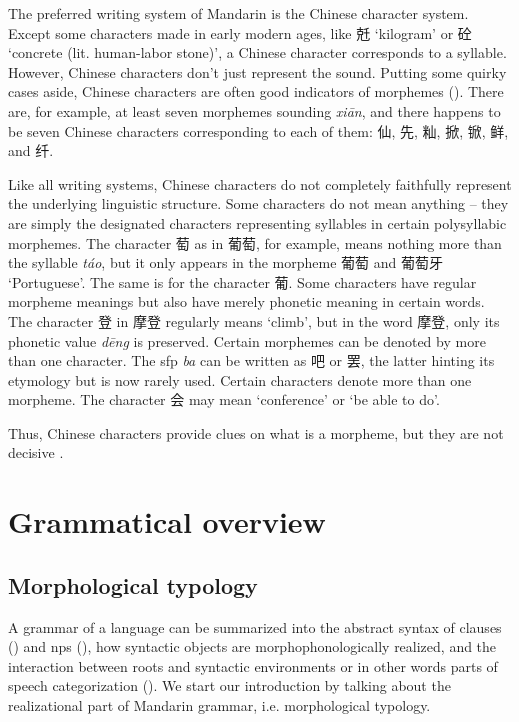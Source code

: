 \documentclass[UTF8, a4paper, oneside, scheme=plain, 12pt]{ctexrep}
\newcommand{\form}[1]{\emph{#1}}
\newcommand{\translate}[1]{`#1'}
\begin{document}
The preferred writing system of Mandarin is the Chinese character system.
Except some characters made in early modern ages,
like 兛 \translate{kilogram} or 砼 \translate{concrete (lit. human-labor stone)},
a Chinese character corresponds to a syllable.
However, Chinese characters don't just represent the sound.
Putting some quirky cases aside,
Chinese characters are often good indicators of morphemes
().
There are, for example, at least seven morphemes sounding \form{xi\={a}n},
and there happens to be seven Chinese characters corresponding to each of them:
仙, 先, 籼, 掀, 锨, 鲜, and 纤.

Like all writing systems, 
Chinese characters do not completely faithfully represent 
the underlying linguistic structure.
Some characters do not mean anything -- 
they are simply the designated characters representing syllables 
in certain polysyllabic morphemes.
The character 萄 as in 葡萄, for example, 
means nothing more than the syllable \form{t\'{a}o},
but it only appears in the morpheme 葡萄 and 葡萄牙 \translate{Portuguese}.
The same is for the character 葡.
Some characters have regular morpheme meanings
but also have merely phonetic meaning in certain words.
The character 登 in 摩登 regularly means \translate{climb},
but in the word 摩登, only its phonetic value \form{d\={e}ng} is preserved.
Certain morphemes can be denoted by more than one character.
The \ac{sfp} \form{ba} can be written as 吧 or 罢,
the latter hinting its etymology but is now rarely used.
Certain characters denote more than one morpheme.
The character 会 may mean \translate{conference} or \translate{be able to do}. 

Thus, Chinese characters provide clues on what is a morpheme,
but they are not decisive \citep[1.1.4]{zhudexigrammar}.


\chapter{Grammatical overview}

\section{Morphological typology}

A grammar of a language can be summarized into the abstract syntax of clauses () and \acp{np} (),
how syntactic objects are morphophonologically realized,
and the interaction between roots and syntactic environments
or in other words parts of speech categorization
().
We start our introduction by talking about the realizational part of Mandarin grammar,
i.e. morphological typology.
\end{document}

